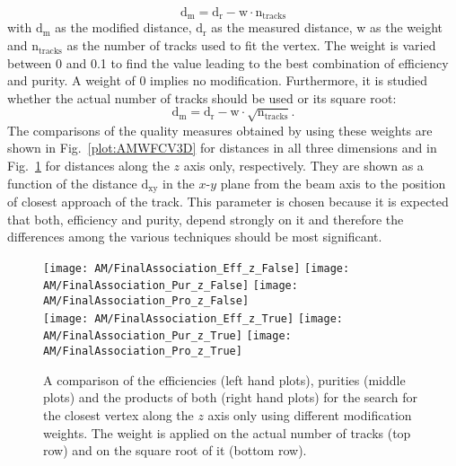 \begin{displaymath}
    \textrm{d}_{\textrm{m}} = \textrm{d}_{\textrm{r}}- \textrm{w} \cdot \textrm{n}_{\textrm{tracks}}
\end{displaymath}
with $\textrm{d}_{\textrm{m}}$ as the modified distance, $\textrm{d}_{\textrm{r}}$ as the measured distance, w as the weight and $\textrm{n}_{\textrm{tracks}}$ as the number of tracks used to fit the vertex. The weight is varied between 0 and 0.1 to find the value leading to the best combination of efficiency and purity. A weight of 0 implies no modification. Furthermore, it is studied whether the actual number of tracks should be used or its square root:
\begin{displaymath}
    \textrm{d}_{\textrm{m}} = \textrm{d}_{\textrm{r}}- \textrm{w} \cdot \sqrt{\textrm{n}_{\textrm{tracks}}}.
\end{displaymath}
The comparisons of the quality measures obtained by using these weights are shown in Fig.~\ref{plot:AMWFCV3D} for distances in all three dimensions and in Fig.~\ref{plot:AMWFCVZ} for distances along the $z$ axis only, respectively. They are shown as a function of the distance $\textrm{d}_{\textrm{xy}}$ in the $x$-$y$ plane from the beam axis to the position of closest approach of the track. This parameter is chosen because it is expected that both, efficiency and purity, depend strongly on it and therefore the differences among the various techniques should be most significant.

\begin{figure}[!ht]
    \centering
    \texttt{[image: AM/FinalAssociation\_Eff\_z\_False]}
    \texttt{[image: AM/FinalAssociation\_Pur\_z\_False]}
    \texttt{[image: AM/FinalAssociation\_Pro\_z\_False]}
    \\
    \texttt{[image: AM/FinalAssociation\_Eff\_z\_True]}
    \texttt{[image: AM/FinalAssociation\_Pur\_z\_True]}
    \texttt{[image: AM/FinalAssociation\_Pro\_z\_True]}
    \caption[Efficiencies, purities and their product using different modification weights for the search along $z$ axis only.]{A comparison of the efficiencies (left hand plots), purities (middle plots) and the products of both (right hand plots) for the search for the closest vertex along the $z$ axis only using different modification weights. The weight is applied on the actual number of tracks (top row) and on the square root of it (bottom row).\label{plot:AMWFCVZ}}
\end{figure}

